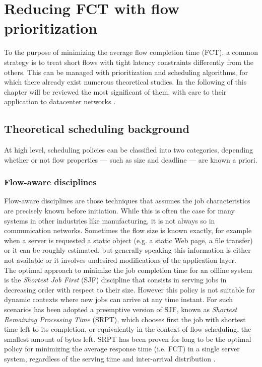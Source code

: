 \chapter{Reducing FCT with flow prioritization}
\label{ch:theoretical-scheduling-bg}
To the purpose of minimizing the average flow completion time (FCT), a common strategy is to treat short flows with tight latency constraints differently from the others. This can be managed with prioritization and scheduling algorithms, for which there already exist numerous theoretical studies. In the following of this chapter will be reviewed the most significant of them, with care to their application to datacenter networks \cite{dpp, 188942, pFabric, pias, one-more-queue, pdq}. 

\section{Theoretical scheduling background}
At high level, scheduling policies can be classified into two categories, depending whether or not flow properties --- such as size and deadline --- are known a priori.

\subsection{Flow-aware disciplines}
Flow-aware disciplines are those techniques that assumes the job characteristics are precisely known before initiation. While this is often the case for many systems in other industries like manufacturing, it is not always so in communication networks. Sometimes the flow size is known exactly, for example when a server is requested a static object (e.g. a static Web page, a file transfer) or it can be roughly estimated, but generally speaking this information is either not available or it involves undesired modifications of the application layer. \\
The optimal approach to minimize the job completion time for an offline system is the \emph{Shortest Job First} (SJF) discipline that consists in serving jobs in decreasing order with respect to their size. However this policy is not suitable for dynamic contexts where new jobs can arrive at any time instant. For such scenarios has been adopted a preemptive version of SJF, known as \emph{Shortest Remaining Processing Time} (SRPT), which chooses first the job with shortest time left to its completion, or equivalently in the context of flow scheduling, the smallest amount of bytes left. SRPT has been proven for long to be the optimal policy for minimizing the average response time (i.e. FCT) in a single server system, regardless of the serving time and inter-arrival distribution \cite{schrage_1968}. 

